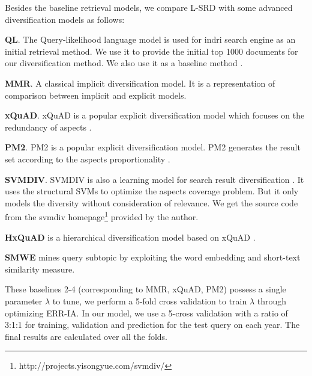 \documentclass[review]{elsarticle}
\newcommand\revised[1]{{\color{black} #1}}
\begin{document}
Besides the baseline retrieval models, we compare L-SRD with some advanced diversification models as follows:
\begin{itemize}
    \item \textbf{QL}. The Query-likelihood language model is used for indri search engine as an initial retrieval method. We use it to provide the initial top 1000 documents for our diversification method. We also use it as a baseline method \cite{dang2012diversity}.
    
	\item \textbf{MMR}. A classical implicit diversification model. It is a representation of comparison between implicit and explicit models\cite{carbonell1998use}.
	
	\item \textbf{xQuAD}. xQuAD is a popular explicit diversification model which focuses on the redundancy of aspects \cite{santos2010exploiting}.
	
	\item \textbf{PM2}. PM2 is a popular explicit diversification model. PM2 generates the result set according to the aspects proportionality \cite{dang2012diversity}.
	
    \item \textbf{SVMDIV}. SVMDIV is also a learning model for search result diversification \cite{yue2008predicting}. It uses the structural SVMs to optimize the aspects coverage problem. But it only models the diversity without consideration of relevance. We get the source code from the svmdiv homepage\footnote{http://projects.yisongyue.com/svmdiv/} provided by the author.
    
    \revised{
    	\item \textbf{HxQuAD} is a hierarchical diversification model based on xQuAD \cite{Hu15searchresult}.
    	}
    
    \item \textbf{SMWE} mines query subtopic by exploiting the word embedding and short-text similarity measure. \cite{Ullah2016QuerySM}
\end{itemize}


\revised{
These baselines 2-4 (corresponding to MMR, xQuAD, PM2) possess a single parameter $\lambda$ to tune, we perform a 5-fold cross validation to train $\lambda$ through optimizing ERR-IA. In our model, we use a 5-cross validation with a ratio of 3:1:1 for training, validation and prediction for the test query on each year. The final results are calculated over all the folds.}
\end{document}
